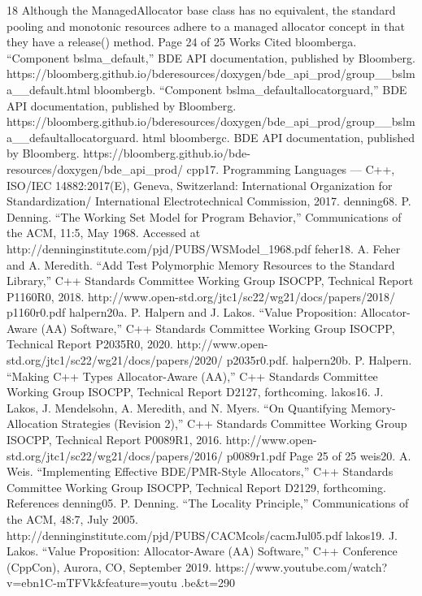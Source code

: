 18 Although the ManagedAllocator base class has no equivalent, the standard pooling and
monotonic resources adhere to a managed allocator concept in that they have a release()
method.
Page 24 of 25
Works Cited
bloomberga. “Component bslma_default,” BDE API documentation, published
by Bloomberg.
https://bloomberg.github.io/bderesources/doxygen/bde_api_prod/group__bslma__default.html
bloombergb. “Component bslma_defaultallocatorguard,” BDE API
documentation, published by Bloomberg.
https://bloomberg.github.io/bderesources/doxygen/bde_api_prod/group__bslma__defaultallocatorguard.
html
bloombergc. BDE API documentation, published by Bloomberg.
https://bloomberg.github.io/bde-resources/doxygen/bde_api_prod/
cpp17. Programming Languages — C++, ISO/IEC 14882:2017(E), Geneva,
Switzerland: International Organization for Standardization/
International Electrotechnical Commission, 2017.
denning68. P. Denning. “The Working Set Model for Program Behavior,”
Communications of the ACM, 11:5, May 1968.
Accessed at http://denninginstitute.com/pjd/PUBS/WSModel_1968.pdf
feher18. A. Feher and A. Meredith. “Add Test Polymorphic Memory Resources
to the Standard Library,” C++ Standards Committee Working Group
ISOCPP, Technical Report P1160R0, 2018.
http://www.open-std.org/jtc1/sc22/wg21/docs/papers/2018/
p1160r0.pdf
halpern20a. P. Halpern and J. Lakos. “Value Proposition: Allocator-Aware (AA)
Software,” C++ Standards Committee Working Group ISOCPP, Technical
Report P2035R0, 2020.
http://www.open-std.org/jtc1/sc22/wg21/docs/papers/2020/
p2035r0.pdf.
halpern20b. P. Halpern. “Making C++ Types Allocator-Aware (AA),” C++
Standards Committee Working Group ISOCPP, Technical Report D2127,
forthcoming.
lakos16. J. Lakos, J. Mendelsohn, A. Meredith, and N. Myers. “On Quantifying
Memory-Allocation Strategies (Revision 2),” C++ Standards Committee
Working Group ISOCPP, Technical Report P0089R1, 2016.
http://www.open-std.org/jtc1/sc22/wg21/docs/papers/2016/
p0089r1.pdf
Page 25 of 25
weis20. A. Weis. “Implementing Effective BDE/PMR-Style Allocators,” C++
Standards Committee Working Group ISOCPP, Technical Report D2129,
forthcoming.
References
denning05. P. Denning. “The Locality Principle,” Communications of the ACM,
48:7, July 2005.
http://denninginstitute.com/pjd/PUBS/CACMcols/cacmJul05.pdf
lakos19. J. Lakos. “Value Proposition: Allocator-Aware (AA) Software,” C++
Conference (CppCon), Aurora, CO, September 2019.
https://www.youtube.com/watch?v=ebn1C-mTFVk&feature=youtu
.be&t=290

